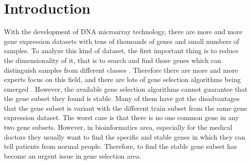 \documentclass[runningheads,a4paper]{llncs}
\newcommand{\keywords}[1]{\par\addvspace\baselineskip
\noindent\keywordname\enspace\ignorespaces#1}
\begin{document}
\begin{abstract}
In order to solve the problem that the selected genes are depend on the train subset in the gene subset selection algorithms, we propose an assemble method to select the discrimination genes for cancers, so that a stable gene subset can be obtained. We randomly extract some proportional samples from train subset and cluster the genes of these samples in K-means, then select a typical gene from each cluster according to its weight estimated in Pearson correlation coefficient between genes and labels. This process is repeated several times. Those genes with high frequencies in the processes are selected to construct the selected gene subset. The power of the proposed method is tested on three very popular gene datasets, and the experimental results demonstrate that the new algorithm proposed in this paper has found the most stable gene subset with the highest classification accuracy.
\keywords{gene selection\enspace\enspace gene subsets\enspace\enspace K-means\enspace\enspace assemble\enspace\enspace Pearson correlation coefficient\enspace\enspace cancers}
\end{abstract}


\section{Introduction}

With the development of DNA microarray technology, there are more and more gene expression datasets with tens of thousands of genes and small numbers of samples. To analyze this kind of dataset, the first important thing is to reduce the dimensionality of it, that is to search and find those genes which can distinguish samples from different classes \cite{ding2005minimum,guyon2003introduction,guyon2002gene}. Therefore there are more and more experts focus on this field, and there are lots of gene selection algorithms being emerged \cite{bermejo2011grasp,sasikala2014multi,lu2012novel}. However, the available gene selection algorithms cannot guarantee that the gene subset they found is stable. Many of them have got the disadvantages that the gene subset is variant with the different train subset from the same gene expression dataset. The worst case is that there is no one common gene in any two gene subsets. However, in bioinformatics area, especially for the medical doctors they usually want to find the specific and stable genes in which they can tell patients from normal people. Therefore, to find the stable gene subset has become an urgent issue in gene selection  area. 
\end{document}
